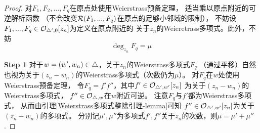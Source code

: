 \begin{proof}
对$F_1,F_2,...,F_q$在原点处使用Weierstrass预备定理，
适当乘以原点附近的可逆解析函数
（不会改变$\mathcal{R}(F_1,...,F_q)$在原点的足够小邻域的限制），
不妨设$F_1,...,F_q\in\mathcal{O}_{\triangle',0}[z_n]$为定义在原点附近的
关于$z_n$的Weieretrass多项式。此外，不妨
$$
  \deg_{z_n}F_q=\mu
$$

\textbf{Step 1}
对于$w=(w',w_n)\in\triangle$，关于$z_n$的Weierstrass多项式$F_q$
（通过平移）自然也视为关于$(z_n-w_n)$的Weierstrass多项式（次数仍为$\mu$）。
对$F_q$在$w$处使用Weierstrass预备定理，
令$F_q=f'f''$，其中$f'\in\mathcal{O}_{\triangle',w'}[z_n]$
为关于$(z_n-w_n)$的Weierstrass多项式，
$f''\in\mathcal{O}_{\triangle,w}$在$w$附近可逆。
注意$F_q$与$f'$都为Weierstrass多项式，
从而由引理\ref{Weierstrass多项式整除引理-lemma}可知
$f''\in\mathcal{O}_{\triangle',w'}[z_n]$为关于$(z_n-w_n)$的多项式。
分别记$\mu',\mu''$为多项式$f',f''$关于$z_n$的次数，则$\mu=\mu'+\mu''$.\vs


\end{proof}
